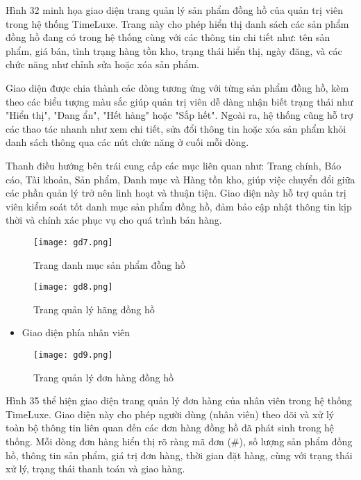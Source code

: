Hình 32 minh họa giao diện trang quản lý sản phẩm đồng hồ của quản trị viên trong hệ thống TimeLuxe. Trang này cho phép hiển thị danh sách các sản phẩm đồng hồ đang có trong hệ thống cùng với các thông tin chi tiết như: tên sản phẩm, giá bán, tình trạng hàng tồn kho, trạng thái hiển thị, ngày đăng, và các chức năng như chỉnh sửa hoặc xóa sản phẩm.

Giao diện được chia thành các dòng tương ứng với từng sản phẩm đồng hồ, kèm theo các biểu tượng màu sắc giúp quản trị viên dễ dàng nhận biết trạng thái như "Hiển thị", "Đang ẩn", "Hết hàng" hoặc "Sắp hết". Ngoài ra, hệ thống cũng hỗ trợ các thao tác nhanh như xem chi tiết, sửa đổi thông tin hoặc xóa sản phẩm khỏi danh sách thông qua các nút chức năng ở cuối mỗi dòng.

Thanh điều hướng bên trái cung cấp các mục liên quan như: Trang chính, Báo cáo, Tài khoản, Sản phẩm, Danh mục và Hàng tồn kho, giúp việc chuyển đổi giữa các phần quản lý trở nên linh hoạt và thuận tiện. Giao diện này hỗ trợ quản trị viên kiểm soát tốt danh mục sản phẩm đồng hồ, đảm bảo cập nhật thông tin kịp thời và chính xác phục vụ cho quá trình bán hàng.

\begin{figure}[H]
  \centering
  \texttt{[image: gd7.png]}
  \caption{Trang danh mục sản phẩm đồng hồ}
  \label{fig:admin-categories}
\end{figure}

\begin{figure}[H]
  \centering
  \texttt{[image: gd8.png]}
  \caption{Trang quản lý hãng đồng hồ}
  \label{fig:admin-brands}
\end{figure}

\begin{itemize}
    \item Giao diện phía nhân viên
\end{itemize}

\begin{figure}[H]
  \centering
  \texttt{[image: gd9.png]}
  \caption{Trang quản lý đơn hàng đồng hồ}
  \label{fig:employee-orders}
\end{figure}

Hình 35 thể hiện giao diện trang quản lý đơn hàng của nhân viên trong hệ thống TimeLuxe. Giao diện này cho phép người dùng (nhân viên) theo dõi và xử lý toàn bộ thông tin liên quan đến các đơn hàng đồng hồ đã phát sinh trong hệ thống. Mỗi dòng đơn hàng hiển thị rõ ràng mã đơn (#), số lượng sản phẩm đồng hồ, thông tin sản phẩm, giá trị đơn hàng, thời gian đặt hàng, cùng với trạng thái xử lý, trạng thái thanh toán và giao hàng.

